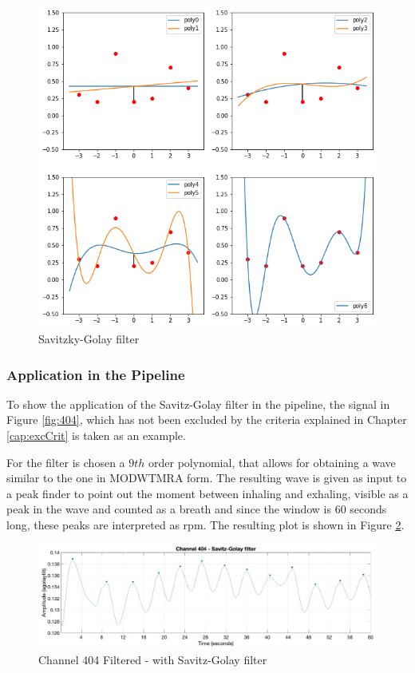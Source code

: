 \begin{figure}[p]
    \centering
    \includegraphics[width=\textwidth]{img/sg_expl.png}
    \caption{Savitzky-Golay filter}
    \label{fig:4sg explain}
\end{figure}
\clearpage



\subsubsection{Application in the Pipeline}

To show the application of the Savitz-Golay filter in the pipeline, the signal in Figure \ref{fig:404}, which has not been excluded by the criteria explained in Chapter \ref{cap:excCrit} is taken as an example.

For the filter is chosen a $9th$ order polynomial, that allows for obtaining a wave similar to the one in MODWTMRA form.
The resulting wave is given as input to a peak finder to point out the moment between inhaling and exhaling, visible as a peak in the wave and counted as a breath and since the window is 60 seconds long, these peaks are interpreted as rpm. The resulting plot is shown in Figure \ref{fig:404sg}.

\vspace*{0.5cm}

\begin{figure}[H]
    \centering
    \includegraphics[width=\textwidth]{img/404sg.jpg}
    \caption{Channel 404 Filtered - with Savitz-Golay filter}
    \label{fig:404sg}
\end{figure}

